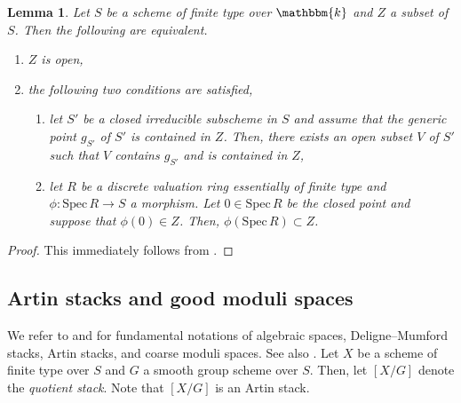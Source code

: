 \documentclass[12pt,twoside]{amsart}
\newtheorem{lem}[thm]{Lemma}
\theoremstyle{definition}
\begin{document}
\begin{lem}\label{lem--openness--criterion}
Let $S$ be a scheme of finite type over $\mathbbm{k}$ and $Z$ a subset of $S$.
Then the following are equivalent.
\begin{enumerate}
    \item $Z$ is open,
    \item the following two conditions are satisfied,
    \begin{enumerate}
        \item let $S'$ be a closed irreducible subscheme in $S$ and assume that the generic point $g_{S'}$ of $S'$ is contained in $Z$. Then, there exists an open subset $V$ of $S'$ such that $V$ contains $g_{S'}$ and is contained in $Z$,
        \item let $R$ be a discrete valuation ring essentially of finite type and $\phi\colon\mathrm{Spec}\, R\to S$ a morphism.
        Let $0\in \mathrm{Spec}\, R$ be the closed point and suppose that $\phi(0)\in Z$.
        Then, $\phi(\mathrm{Spec}\, R)\subset Z$.
    \end{enumerate}
\end{enumerate}
\end{lem}

\begin{proof}
    This immediately follows from \cite[10.14]{kollar-moduli}.
\end{proof}

\subsection{Artin stacks and good moduli spaces}

We refer to \cite{Ols} and \cite{HH} for fundamental notations of algebraic spaces, Deligne--Mumford stacks, Artin stacks, and coarse moduli spaces.
See also \cite[Remark 2.18]{HH}.
Let $X$ be a scheme of finite type over $S$ and $G$ a smooth group scheme over $S$.
Then, let $[X/G]$ denote the {\it quotient stack}.
Note that $[X/G]$ is an Artin stack.
\end{document}
